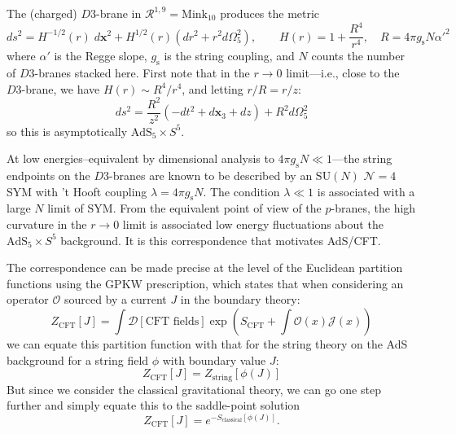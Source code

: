 \documentclass{report}
\begin{document}
The (charged) $ D3 $-brane in $ \mathcal{R}^{1,9}=\text{Mink}_{10} $ produces the metric
\begin{equation*}
	ds^2 = H^{-1/2} (r) \;  d\textbf{x}^2 + H^{1/2}(r)(dr^2 + r^2 d\Omega_5^2),\qquad 
	H(r) = 1 + \frac{R^4}{r^4},\quad R = 4\pi g_{\text{s}} N \alpha'^2
\end{equation*}
where $ \alpha' $ is the Regge slope, $ g_{\text{s}}$ is the string coupling, and $ N $
counts the number of $ D3 $-branes stacked here. First note that in the 
$ r \rightarrow 0 $ limit---i.e., close to the $ D3 $-brane, we have 
$ H(r) \sim R^4/r^4 $, and letting $ r/R = r/z $: 
\begin{equation*}
	ds^2 = \frac{R^2}{z^2}\left(-dt^2 + d\textbf{x}_3 + dz\right) + R^2 d\Omega_5^2
\end{equation*}
so this is asymptotically $ \text{AdS}_5\times S^5 $.

At low energies--equivalent by dimensional analysis to $ 4\pi g_{\text{s}} N \ll
1 $---the string endpoints on the $ D3 $-branes are known to be described by an
$ \text{SU}(N) $ $ \mathcal{N}=4 $ SYM with 't Hooft coupling $ \lambda = 4\pi
g_{\text{s}}N $. The condition $ \lambda \ll 1 $ is associated with a large 
$ N $ limit of SYM.
From the equivalent point of view of the $ p $-branes, the high curvature 
in the $ r \rightarrow 0 $ limit is associated low energy fluctuations about 
the $ \text{AdS}_5 \times S^5 $ background. It is this correspondence that 
motivates AdS/CFT.

 The correspondence can be made precise at the level 
of the Euclidean partition functions using the GPKW prescription, which states that 
when considering an operator $ \mathcal{O} $ sourced by a current $ J$ in the 
boundary theory: 
\begin{equation*}
	Z_{\text{CFT}}[J]
		= \int \mathcal{D}[\text{CFT fields}] \exp \left(
			S_{\text{CFT}} + \int \mathcal{O} (x) \mathcal{J}(x)
		\right)
\end{equation*}
we can equate this partition function with that for the string theory on the 
AdS background for a string field $ \phi $ with boundary value $ J $: 
\begin{equation*}
	Z_{\text{CFT}}[J] = Z_{\text{string}}[\phi(J)]
\end{equation*}
But since we consider the classical gravitational theory, we can go one 
step further and simply equate this to the saddle-point solution
\begin{equation*}
	Z_{\text{CFT}}[J] = e^{-S_{\text{classical}}[\phi(J)]}.
\end{equation*}
\end{document}
